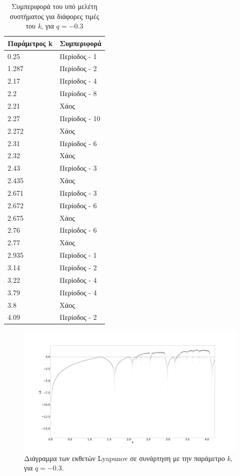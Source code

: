 \begin{table}[ht]
	\centering
	\caption{ Συμπεριφορά του υπό μελέτη συστήματος για διάφορες τιμές του \emph{k}, για $q=-0.3$ }
	\label{tab:abc10}
	\begin{tabular}{l | l}
		Παράμετρος k & Συμπεριφορά \\
		\hline
		0.25 &  Περίοδος -  1 \\
		1.287 &  Περίοδος -  2 \\
		2.17& Περίοδος -  4 \\
		2.2& Περίοδος -  8 \\
		2.21 & Xάος \\
		2.27& Περίοδος - 10 \\
		2.272& Χάος \\
		2.31& Περίοδος - 6 \\
		2.32 &  Χάος \\
		2.43 &  Περίοδος -  3 \\
		2.435 &  Χάος \\
		2.671 &  Περίοδος -  3\\
		2.672 & Περίοδος - 6\\
		2.675 & Χάος\\
		2.76 &Περίοδος - 6 \\
		2.77& Χάος\\
		2.935 & Περίοδος -  1\\
		3.14& Περίοδος - 2\\
		3.22 & Περίοδος -  4\\
		3.79 &Περίοδος - 4\\
		3.8 & Χάος\\
		4.09& Περίοδος - 2
		
	\end{tabular}
	
\end{table}


\begin{figure}[ht]
	\centering
	\includegraphics[width=1\linewidth]{LateX images/sine q=-0.3/g2}
	\caption{Διάγραμμα των εκθετών Lyapunov σε συνάρτηση με την παράμετρο \emph{k}, για $q=-0.3$.}
	\label{f:g45}
\end{figure}



